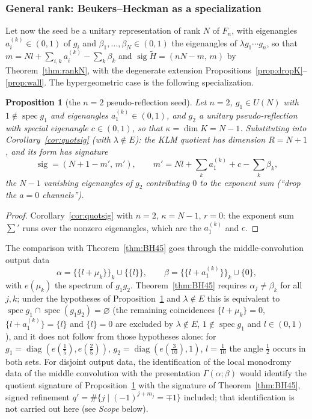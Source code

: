 \documentclass[11pt]{article}
\newtheorem{proposition}[theorem]{Proposition}
\theoremstyle{definition}
\newcommand{\Ht}{\widetilde H}
\newcommand{\frc}[1]{\{#1\}}
\begin{document}
\subsubsection{General rank: Beukers--Heckman as a specialization}
Let now the seed be a unitary representation of rank $N$ of $F_n$, with
eigenangles $a_i^{(k)}\in(0,1)$ of $g_i$ and
$\beta_1,\dots,\beta_N\in(0,1)$ the eigenangles of $\lambda g_1\cdots g_n$,
so that $m=Nl+\sum_{i,k}a_i^{(k)}-\sum_k\beta_k$ and
$\operatorname{sig}\Ht=(nN-m,\,m)$ by Theorem~\ref{thm:rankN}, with the
degenerate extension Propositions~\ref{prop:dropK}--\ref{prop:wall}.
The hypergeometric case is the following specialization.

\begin{proposition}[the $n=2$ pseudo-reflection seed]\label{prop:bh-seed}
Let $n=2$, $g_1\in U(N)$ with $1\notin\operatorname{spec}g_1$ and
eigenangles $a_1^{(k)}\in(0,1)$, and
$g_2$ a unitary pseudo-reflection with special eigenangle $c\in(0,1)$,
so that $\kappa=\dim K=N-1$. Substituting into
Corollary~\ref{cor:quotsig} (with $\lambda\notin E$): the KLM quotient
has dimension $R=N+1$, and its form has signature
\[
\operatorname{sig}=(N+1-m',\,m'),\qquad
m'=Nl+\sum_k a_1^{(k)}+c-\sum_k\beta_k ,
\]
the $N-1$ vanishing eigenangles of $g_2$ contributing $0$ to the
exponent sum (``drop the $a=0$ channels'').
\end{proposition}

\begin{proof}
Corollary~\ref{cor:quotsig} with $n=2$, $\kappa=N-1$, $r=0$: the
exponent sum $\sum'$ runs over the nonzero eigenangles, which are the
$a_1^{(k)}$ and $c$.
\end{proof}

The comparison with Theorem~\ref{thm:BH45} goes through the
middle-convolution output data
\begin{equation}\label{eq:dict-bh-N}
\alpha=\{\frc{l+\mu_k}\}_{k}\cup\{\frc{l}\},
\qquad
\beta=\{\frc{l+a_1^{(k)}}\}_{k}\cup\{0\},
\end{equation}
with $e(\mu_k)$ the spectrum of $g_1g_2$. Theorem~\ref{thm:BH45}
requires $\alpha_j\neq\beta_k$ for all $j,k$; under the hypotheses of
Proposition~\ref{prop:bh-seed} and $\lambda\notin E$ this is
equivalent to
$\operatorname{spec}g_1\cap\operatorname{spec}(g_1g_2)=\varnothing$
(the remaining coincidences $\frc{l+\mu_k}=0$, $\frc{l+a_1^{(k)}}=\frc l$
and $\frc l=0$ are excluded by $\lambda\notin E$,
$1\notin\operatorname{spec}g_1$ and $l\in(0,1)$), and it does not
follow from those hypotheses alone: for
$g_1=\operatorname{diag}(e(\tfrac15),e(\tfrac25))$,
$g_2=\operatorname{diag}(e(\tfrac3{10}),1)$, $l=\tfrac1{10}$ the angle
$\tfrac12$ occurs in both sets. For disjoint output data, the
identification of the local monodromy data of the middle convolution
with the presentation $\Gamma(\alpha;\beta)$ would identify the
quotient signature of Proposition~\ref{prop:bh-seed} with the
signature of Theorem~\ref{thm:BH45}, signed refinement
$q'=\#\{j\mid(-1)^{j+m_j}=\mp1\}$ included; that identification is
not carried out here (see \emph{Scope} below).
\end{document}

